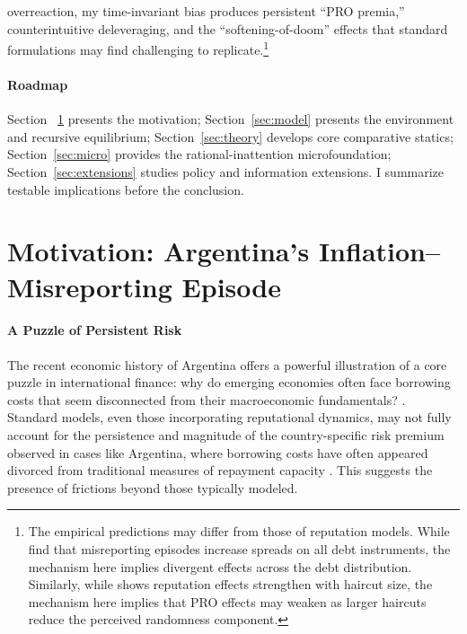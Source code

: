 \documentclass[12pt]{article}
\theoremstyle{plain}
\begin{document}
overreaction, my time-invariant bias produces persistent ``PRO premia,''
counterintuitive deleveraging, and the ``softening-of-doom'' effects that
standard formulations may find challenging to replicate.\footnote{The empirical
	predictions may differ from those of reputation models. While
	\citet{MorelliMoretti2023} find that misreporting episodes increase spreads on
	all debt instruments, the mechanism here implies divergent effects across the
	debt distribution. Similarly, while \citet{AmadorPhelan2023} shows reputation
	effects strengthen with haircut size, the mechanism here implies that PRO
	effects may weaken as larger haircuts reduce the perceived randomness
	component.}

\paragraph{Roadmap} Section ~\ref{sec:motivation} presents the motivation; Section~\ref{sec:model}
presents the environment and recursive equilibrium; Section~\ref{sec:theory}
develops core comparative statics; Section~\ref{sec:micro} provides the
rational‑inattention microfoundation; Section~\ref{sec:extensions} studies
policy and information extensions. I summarize testable implications before the
conclusion.
\section{Motivation: Argentina's Inflation--Misreporting Episode}
\label{sec:motivation}

\paragraph{A Puzzle of Persistent Risk}
The recent economic history of Argentina offers a powerful illustration of a
core puzzle in international finance: why do emerging economies often face
borrowing costs that seem disconnected from their macroeconomic fundamentals?
\citet{TomzWright2013, MeyerReinhartTrebesch2022}. Standard models, even those
incorporating reputational dynamics, may not fully account for the persistence
and magnitude of the country-specific risk premium observed in cases like
Argentina, where borrowing costs have often appeared divorced from traditional
measures of repayment capacity \citet{MorelliMoretti2023}. This suggests the
presence of frictions beyond those typically modeled.
\end{document}
